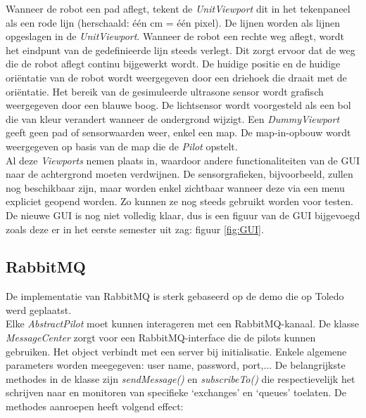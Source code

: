 \documentclass[tt1]{penoverslag}
\begin{document}
Wanneer de robot een pad aflegt, tekent de \textit{UnitViewport} dit in het tekenpaneel als een rode lijn (herschaald: \'e\'en cm = \'e\'en pixel). De lijnen worden als lijnen opgeslagen in de \textit{UnitViewport}. Wanneer de robot een rechte weg aflegt, wordt het eindpunt van de gedefinieerde lijn steeds verlegt. Dit zorgt ervoor dat de weg die de robot aflegt continu bijgewerkt wordt. De huidige positie en de huidige ori\"entatie van de robot wordt weergegeven door een driehoek die draait met de ori\"entatie. Het bereik van de gesimuleerde ultrasone sensor wordt grafisch weergegeven door een blauwe boog. De lichtsensor wordt voorgesteld als een bol die van kleur verandert wanneer de ondergrond wijzigt. 
Een \textit{DummyViewport} geeft geen pad of sensorwaarden weer, enkel een map. De map-in-opbouw wordt weergegeven op basis van de map die de \textit{Pilot} opstelt.\\

Al deze \textit{Viewports} nemen plaats in, waardoor andere functionaliteiten van de GUI naar de achtergrond moeten verdwijnen. De sensorgrafieken, bijvoorbeeld, zullen nog beschikbaar zijn, maar worden enkel zichtbaar wanneer deze via een menu expliciet geopend worden. Zo kunnen ze nog steeds gebruikt worden voor testen.\\

De nieuwe GUI is nog niet volledig klaar, dus is een figuur van de GUI bijgevoegd zoals deze er in het eerste semester uit zag: figuur \ref{fig:GUI}.


\subsection{RabbitMQ}
\label{ssec:RabbMQ}
De implementatie van RabbitMQ \cite{RabbitMQ} is sterk gebaseerd op de demo die op Toledo werd geplaatst.\\

Elke \textit{AbstractPilot} moet kunnen interageren met een RabbitMQ-kanaal. De klasse \textit{MessageCenter} zorgt voor een RabbitMQ-interface die de pilots kunnen gebruiken. Het object verbindt met een server bij initialisatie. Enkele algemene parameters worden meegegeven: user name, password, port,... De belangrijkste methodes in de klasse zijn \textit{sendMessage()} en \textit{subscribeTo()} die respectievelijk het schrijven naar en monitoren van specifieke `exchanges' en `queues' toelaten. De methodes aanroepen heeft volgend effect:\\
\end{document}

